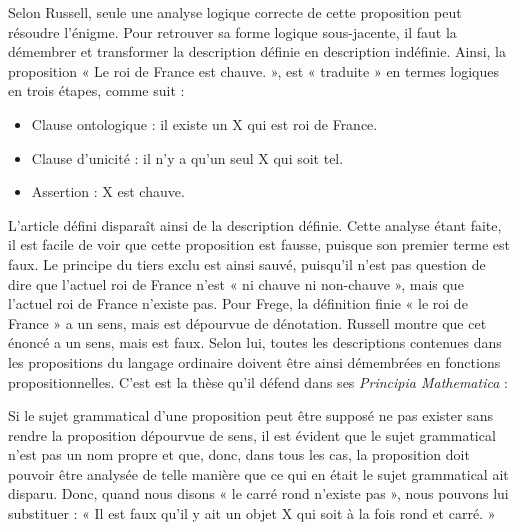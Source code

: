 Selon Russell, seule une analyse logique correcte de cette proposition peut résoudre l’énigme. Pour retrouver sa forme logique sous-jacente, il faut la démembrer et transformer la description définie en description indéfinie. Ainsi, la proposition « Le roi de France est chauve. », est « traduite » en termes logiques en trois étapes, comme suit :
\begin{itemize}
\item Clause ontologique : il existe un X qui est roi de France.
\item Clause d’unicité : il n’y a qu’un seul X qui soit tel.
\item Assertion : X est chauve.
\end{itemize}
L’article défini disparaît ainsi de la description définie. Cette analyse étant faite, il est facile de voir que cette proposition est fausse, puisque son premier terme est faux. Le principe du tiers exclu est ainsi sauvé, puisqu’il n’est pas question de dire que l’actuel roi de France n’est « ni chauve ni non-chauve », mais que l’actuel roi de France n’existe pas. Pour Frege, la définition finie « le roi de France » a un sens, mais est dépourvue de dénotation. Russell montre que cet énoncé a un sens, mais est faux. Selon lui, toutes les descriptions contenues dans les propositions du langage ordinaire doivent être ainsi démembrées en fonctions propositionnelles. C’est est la thèse qu’il défend dans ses \textit{Principia Mathematica} :

\begin{lecture}{}
Si le sujet grammatical d’une proposition peut être supposé ne pas exister sans rendre la proposition dépourvue de sens, il est évident que le sujet grammatical n’est pas un nom propre et que, donc, dans tous les cas, la proposition doit pouvoir être analysée de telle manière que ce qui en était le sujet grammatical ait disparu. Donc, quand nous disons « le carré rond n’existe pas », nous pouvons lui substituer : « Il est faux qu’il y ait un objet X qui soit à la fois rond et carré. »
\end{lecture}

